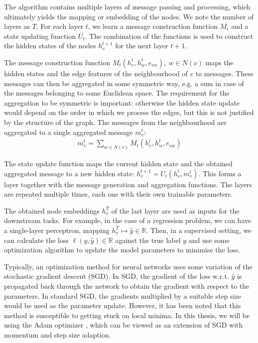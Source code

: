 \documentclass[english, 12pt, a4paper, sci, utf8, a-2b, online]{aaltothesis}
\newcommand{\R}{\mathbb{R}}
\begin{document}
The algorithm contains multiple layers of message passing and processing, which ultimately yields the mapping or embedding of the nodes. We note the number of layers as $T$. For each layer $t$, we learn a message construction function $M_t$ and a state updating function $U_t$. The combination of the functions is used to construct the hidden states of the nodes $h_v^{t+1}$ for the next layer $t+1$.

The message construction function $M_t(h_v^t, h_w^t, e_{vw}),\ w \in N(v)$ maps the hidden states and the edge features of the neighbourhood of $v$ to messages. These messages can then be aggregated in some symmetric way, e.g. a sum in case of the messages belonging to some Euclidean space. The requirement for the aggregation to be symmetric is important: otherwise the hidden state update would depend on the order in which we process the edges, but this is not justified by the structure of the graph. The messages from the neighbourhood are aggregated to a single aggregated message $m_v^t$:
\begin{align}
    m_v^t = \sum_{w \in N(v)}M_t(h_v^t, h_w^t, e_{vw})
\end{align}

The state update function maps the current hidden state and the obtained aggregated message to a new hidden state: $h_v^{t+1} = U_t(h_v^t, m_v^t)$. This forms a layer together with the message generation and aggregation functions. The layers are repeated multiple times, each one with their own trainable parameters.

The obtained node embeddings $h_v^T$ of the last layer are used as inputs for the downstream tasks. For example, in the case of a regression problem, we can have a single-layer perceptron, mapping $h_v^T \mapsto \hat{y} \in \R$. Then, in a supervised setting, we can calculate the loss $\ell(y, \hat{y}) \in \R$ against the true label $y$ and use some optimization algorithm to update the model parameters to minimise the loss.

Typically, an optimization method for neural networks uses some variation of the stochastic gradient descent (SGD). In SGD, the gradient of the loss w.r.t. $\hat{y}$ is propagated back through the network to obtain the gradient with respect to the parameters. In standard SGD, the gradients multiplied by a suitable step size would be used as the parameter update. However, it has been noted that this method is susceptible to getting stuck on local minima. In this thesis, we will be using the Adam optimizer \cite{adam-2014}, which can be viewed as an extension of SGD with momentum and step size adaption.
\end{document}
